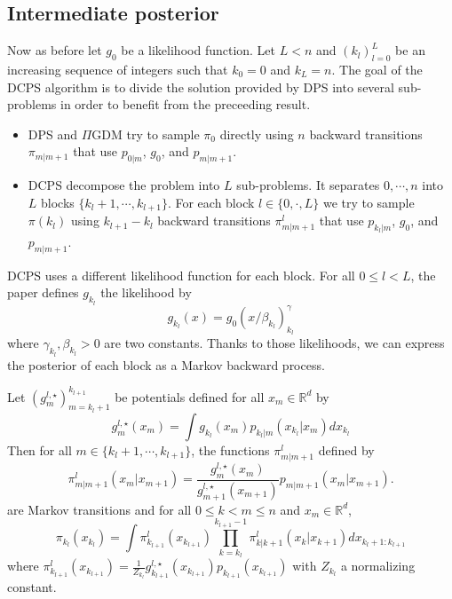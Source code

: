 \documentclass[12pt]{article}
\begin{document}
\subsection{Intermediate posterior}

Now as before let $g_0$ be a likelihood function.
Let $L < n$ and $(k_l)_{l=0}^L$ be an increasing sequence of integers such that $k_0 = 0$ 
and $k_L = n$. The goal of the DCPS algorithm is to divide the solution provided by DPS
into several sub-problems in order to benefit from the preceeding result.
\begin{itemize}
\item DPS and $\Pi$GDM try to sample $\pi_0$ directly using $n$ backward transitions
$\pi_{m|m+1}$ that use $p_{0|m}$, $g_{0}$, and $p_{m|m+1}$.
\item DCPS decompose the problem into $L$ sub-problems. It separates ${0,\cdots, n}$ 
into $L$ blocks $\{k_l + 1, \cdots, k_{l+1}\}.$
For each block $l \in \{0,\cdot, L\}$ we try to sample $\pi(k_l)$ using 
$k_{l+1} - k_l$ backward transitions
$\pi_{m|m+1}^l$ that use $p_{k_l|m}$, $g_0$, and $p_{m|m+1}$.
\end{itemize}

DCPS uses a different likelihood function for each block. For all $0 \leq l < L$,
the paper defines $g_{k_l}$ the likelihood by
$$g_{k_l}(x) = g_0(x/\beta_{k_l})^\gamma_{k_l}$$
where $\gamma_{k_l}, \beta_{k_l} > 0$ are two constants. Thanks to those likelihoods, 
we can express the posterior of each block as a Markov backward process.

\begin{assumption}
    \label{ass:block_posterior}
    Let $(g_m^{l,\star})_{m=k_l+1}^{k_{l+1}}$ be potentials defined for all $x_m \in \mathbb{R}^d$ by
    \begin{equation}
    g_m^{l,\star} (x_m) = \int g_{k_l}(x_m) p_{k_l|m}(x_{k_l} | x_m) dx_{k_l}
    \end{equation}
    Then for all $m \in \{k_l+1, \cdots, k_{l+1}\}$, the functions $\pi_{m|m+1}^l$ defined by
    $$\pi^l_{m|m+1}(x_m | x_{m+1}) = \frac{g_m^{l,\star}(x_m)}{g_{m+1}^{l,\star}(x_{m+1})} p_{m|m+1}(x_m | x_{m+1}).$$
    are Markov transitions and for all $0 \leq k < m \leq n$ and $x_m \in \mathbb{R}^d$,
    $$\pi_{k_l}(x_{k_l}) = \int \pi^l_{k_{l+1}}(x_{k_{l+1}}) 
    \prod_{k=k_l}^{k_{l+1}-1} \pi_{k|k+1}^l(x_k | x_{k+1}) dx_{k_l+1:k_{l+1}}$$
     where
    $\pi^l_{k_{l+1}}(x_{k_{l+1}}) = \frac{1}{Z_{k_l}} g_{k_{l+1}}^{l,\star}(x_{k_{l+1}}) p_{k_{l+1}}(x_{k_{l+1}})$ 
    with $Z_{k_l}$ a normalizing constant. 
\end{assumption}
\end{document}
